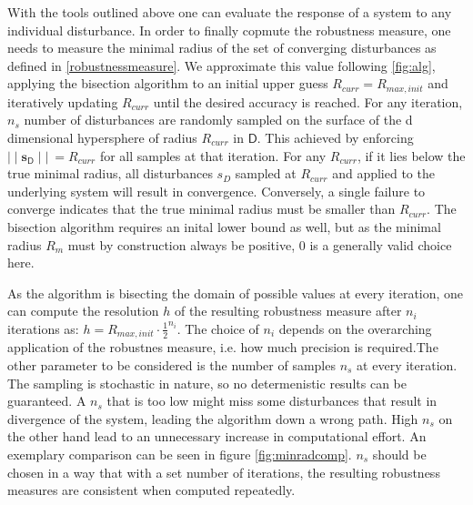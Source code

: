 
    With the tools outlined above one can evaluate the response of a system to any individual disturbance. In order to finally copmute the robustness measure, one needs to measure the minimal radius of the set of converging disturbances as defined in \ref{robustnessmeasure}. We approximate this value following \ref{fig:alg}, applying the bisection algorithm to an initial upper guess $R_{curr} =  R_{max,init}$ and iteratively updating $R_{curr}$ until the desired accuracy is reached. For any iteration, $n_{s}$ number of disturbances are randomly sampled on the surface of the d dimensional hypersphere of radius $R_{curr}$ in $\mathsf{D}$. This achieved by enforcing $\mid\mid \mathbf{s}_{\mathsf{D}}\mid\mid\ = R_{curr}$ for all samples at that iteration. For any $R_{curr}$, if it lies below the true minimal radius, all disturbances ${s_D}$ sampled at $R_{curr}$ and applied to the underlying system will result in convergence. Conversely, a single failure to converge indicates that the true minimal radius must be smaller than $R_{curr}$. The bisection algorithm requires an inital lower bound as well, but as the minimal radius $R_m$ must by construction always be positive, 0 is a generally valid choice here. 

    As the algorithm is bisecting the domain of possible values at every iteration, one can compute the resolution $h$ of the resulting robustness measure after $n_i$ iterations as: $h = R_{max,init}\cdot\frac{1}{2}^{n_i}$. The choice of $n_i$ depends on the overarching application of the robustnes measure, i.e. how much precision is required.The other parameter to be considered is the number of samples $n_{s}$ at every iteration. The sampling is stochastic in nature, so no determenistic results can be guaranteed. A $n_{s}$ that is too low might miss some disturbances that result in divergence of the system, leading the algorithm down a wrong path. High $n_{s}$ on the other hand lead to an unnecessary increase in computational effort. An exemplary comparison can be seen in figure \ref{fig:minradcomp}. 
    $n_{s}$ should be chosen in a way that with a set number of iterations, the resulting robustness measures are consistent when computed repeatedly. 


